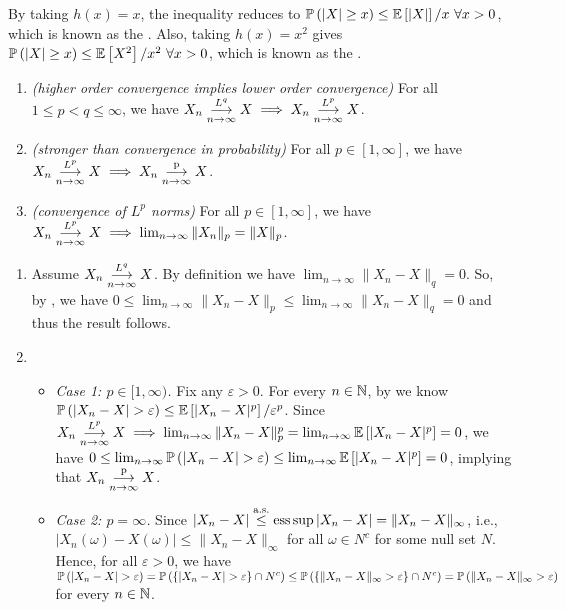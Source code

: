 \begin{enumerate}
\begin{note}
By taking \(h(x)=x\), the inequality reduces to \(\mathbb{P}\left(|X|\ge
x\right)\le\mathbb{E}\left[|X|\right]/x~\forall x>0\), which is known as the . Also,
taking \(h(x)=x^2\) gives \(\mathbb{P}\left(|X|\ge x\right)\le\mathbb{E}\left[X^2\right]/x^2~\forall x>0\), which is known
as the .
\end{note}
\begin{proposition}
\label{prp:conv-lp-prop}
\hfill
\begin{enumerate}
\item \emph{(higher order convergence implies lower order convergence)} For all \(1\le
p<q\le \infty\), we have \(X_n\underset{n\to\infty}{\overset{L^q}{\longrightarrow}}X\implies X_n\underset{n\to\infty}{\overset{L^p}{\longrightarrow}} X\).
\item \emph{(stronger than convergence in probability)} For all \(p\in
[1,\infty]\), we have \(X_n\underset{n\to\infty}{\overset{L^p}{\longrightarrow}} X\implies X_n\underset{n\to\infty}{\overset{\text{p}}{\longrightarrow}} X\).
\item \emph{(convergence of \(L^p\) norms)} For all \(p\in [1,\infty]\), we
have \(X_n\underset{n\to\infty}{\overset{L^p}{\longrightarrow}} X\implies \lim_{n\to\infty}\|X_n\|_{p}=\|X\|_{p}\).
\end{enumerate}
\end{proposition}
\begin{pf}
\begin{enumerate}
\item Assume \(X_n\underset{n\to\infty}{\overset{L^q}{\longrightarrow}}X\). By definition we have
\(\lim_{n\to\infty}\|X_n-X\|_{q}=0\). So, by ,
we have \(0\le
\lim_{n\to\infty}\|X_n-X\|_{p}\le\lim_{n\to\infty}\|X_n-X\|_{q}=0\) and thus
the result follows.
\item
\begin{itemize}
\item \emph{Case 1: \(p\in [1,\infty)\).} Fix any \(\varepsilon>0\). For every
\(n\in\mathbb{N}\), by  we know
\(\prob{|X_n-X|>\varepsilon}\le\expv{|X_n-X|^{p}}/\varepsilon^{p}\). Since
\(X_n\underset{n\to\infty}{\overset{L^p}{\longrightarrow}} X\implies
\lim_{n\to\infty}\|X_n-X\|_{p}^p=\lim_{n\to\infty}\mathbb{E}\left[|X_n-X|^{p}\right]=0\), we have
\(0\le\lim_{n\to\infty}\prob{|X_n-X|>\varepsilon}\le\lim_{n\to\infty}\expv{|X_n-X|^{p}}=0
\), implying that \(X_n\underset{n\to\infty}{\overset{\text{p}}{\longrightarrow}} X\).
\item \emph{Case 2: \(p=\infty\).} Since
\(|X_n-X|\overset{\text{a.s.}}{\le}\operatorname*{ess\,sup}|X_n-X|=\|X_n-X\|_{\infty}\), i.e.,
\(|X_n(\omega)-X(\omega)|\le\|X_n-X\|_{\infty}\) for all \(\omega\in N^c\) for
some null set \(N\).  Hence, for all \(\varepsilon>0\), we have
\(\prob{|X_n-X|>\varepsilon}=
\prob{\{|X_n-X| >\varepsilon\}\cap N^c}
\le\prob{\{\|X_n-X\|_{\infty}>\varepsilon\}\cap N^c}
=\prob{\|X_n-X\|_{\infty}>\varepsilon}\)
for every \(n\in\mathbb{N}\).


\end{itemize}
\end{enumerate}
\end{pf}
\end{enumerate}
